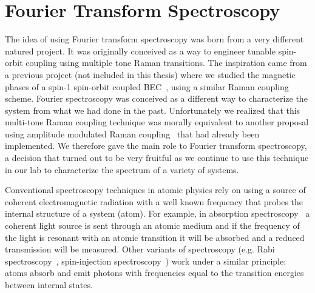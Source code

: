 

\renewcommand{\thechapter}{5}

\chapter{Fourier Transform Spectroscopy}
\label{ch:Fourier_spectroscopy}

The idea of using Fourier transform spectroscopy was born from a very different natured project. It was originally conceived as a way to engineer tunable spin-orbit coupling using multiple tone Raman transitions. The inspiration came from a previous project (not included in this thesis) where we studied the magnetic phases of a spin-1 spin-orbit coupled BEC~\cite{campbell_magnetic_2016}, using a similar Raman coupling scheme. Fourier spectroscopy was conceived as a different way to characterize the system from what we had done in the past. Unfortunately we realized that this multi-tone Raman coupling technique was morally equivalent to another proposal using amplitude modulated Raman coupling~\cite{jimenez-garcia_tunable_2015} that had already been implemented. We therefore gave the main role to Fourier transform spectroscopy, a decision that turned out to be very fruitful as we continue to use this technique in our lab to characterize the spectrum of a variety of systems. 

Conventional spectroscopy techniques in atomic physics rely on using 
a source of coherent electromagnetic radiation with a well known frequency that probes the internal structure of a system (atom). For example, in absorption spectroscopy~\cite{demtroder_doppler-limited_2008} a coherent light source is sent through an atomic medium and if the frequency of the light is resonant with an atomic transition it will be absorbed and a reduced transmission will be measured. Other variants of spectroscopy (e.g. Rabi spectroscopy~\cite{rabi_space_1937}, spin-injection spectroscopy~\cite{cheuk_spin-injection_2012}) work under a similar principle: atoms absorb and emit photons with frequencies equal to the transition energies between internal states. 

